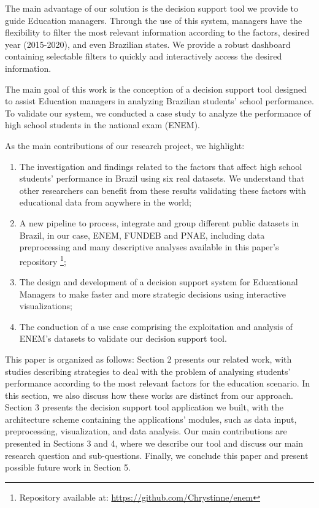 \documentclass[12pt]{article}
\begin{document}
The main advantage of our solution is the decision support tool we provide to guide Education managers. Through the use of this system, managers have the flexibility to filter the most relevant information according to the factors, desired year (2015-2020), and even Brazilian states. We provide a robust dashboard containing selectable filters to quickly and interactively access the desired information.

The main goal of this work is the conception of a decision support tool designed to assist Education managers in analyzing Brazilian students' school performance. To validate our system, we conducted a case study to analyze the performance of high school students in the national exam (ENEM).
 
As the main contributions of our research project, we highlight: 

\begin{enumerate}
    \item The investigation and findings related to the factors that affect high school students’ performance in Brazil using six real datasets. We understand that other researchers can benefit from these results validating these factors with educational data from anywhere in the world;
    \item  A new pipeline to process, integrate and group different public datasets in Brazil, in our case, ENEM, FUNDEB and PNAE, including data preprocessing and many descriptive analyses available in this paper's repository \footnote{Repository available at: \url{https://github.com/Chrystinne/enem}}; 
    \item The design and development of a decision support system for Educational Managers to make faster and more strategic decisions using interactive visualizations;
    \item The conduction of a use case comprising the exploitation and analysis of ENEM's datasets to validate our decision support tool.
    
\end{enumerate}

This paper is organized as follows: Section 2 presents our related work, with studies describing strategies to deal with the problem of analysing students' performance according to the most relevant factors for the education scenario. In this section, we also discuss how these works are distinct from our approach. Section 3 presents the decision support tool application we built, with the architecture scheme containing the applications' modules, such as data input, preprocessing, visualization, and data analysis. Our main contributions are presented in Sections 3 and 4, where we describe our tool and discuss our main research question and sub-questions. Finally, we conclude this paper and present possible future work in Section 5.
\end{document}
